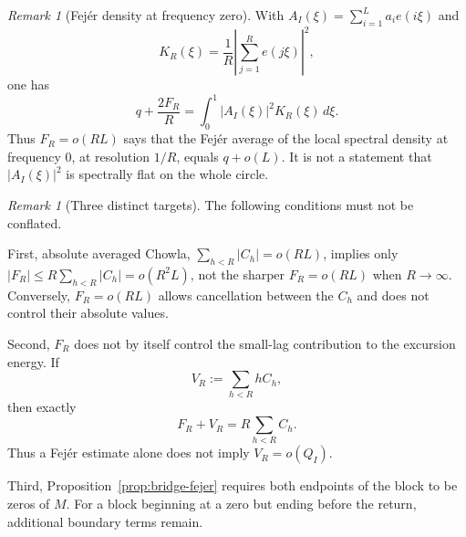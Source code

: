 \documentclass[11pt,reqno]{amsart}
\numberwithin{equation}{section}
\theoremstyle{plain}
\theoremstyle{definition}
\theoremstyle{remark}
\newtheorem{remark}[theorem]{Remark}
\begin{document}
\begin{remark}[Fej\'er density at frequency zero]
\label{rem:fejer-spectrum}
With $A_I(\xi)=\sum_{i=1}^La_ie(i\xi)$ and
\begin{equation}
K_R(\xi)=\frac1R\left|\sum_{j=1}^Re(j\xi)\right|^2,
\end{equation}
one has
\begin{equation}
q+\frac{2F_R}{R}=\int_0^1|A_I(\xi)|^2K_R(\xi)\,d\xi.
\end{equation}
Thus $F_R=o(RL)$ says that the Fej\'er average of the local spectral density
at frequency $0$, at resolution $1/R$, equals $q+o(L)$. It is not a
statement that $|A_I(\xi)|^2$ is spectrally flat on the whole circle.
\end{remark}

\begin{remark}[Three distinct targets]
\label{rem:three-chowla-targets}
The following conditions must not be conflated.

First, absolute averaged Chowla,
$\sum_{h<R}|C_h|=o(RL)$, implies only
$|F_R|\le R\sum_{h<R}|C_h|=o(R^2L)$, not the sharper
$F_R=o(RL)$ when $R\to\infty$. Conversely, $F_R=o(RL)$ allows cancellation
between the $C_h$ and does not control their absolute values.

Second, $F_R$ does not by itself control the small-lag contribution to the
excursion energy. If
\begin{equation}
V_R:=\sum_{h<R}hC_h,
\end{equation}
then exactly
\begin{equation}
\label{eq:F-V-relation}
F_R+V_R=R\sum_{h<R}C_h.
\end{equation}
Thus a Fej\'er estimate alone does not imply $V_R=o(Q_I)$.

Third, Proposition~\ref{prop:bridge-fejer} requires both endpoints of the
block to be zeros of $M$. For a block beginning at a zero but ending before
the return, additional boundary terms remain.
\end{remark}
\end{document}
